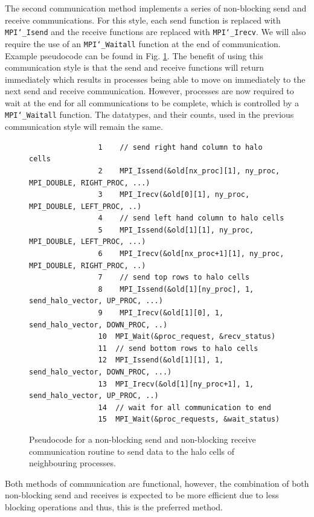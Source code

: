 \documentclass[11pt, a4paper]{article}
\begin{document}
			The second communication method implements a series of non-blocking send and receive communications. For this style, each send function is replaced with \texttt{MPI\char`_Isend} and the receive functions are replaced with \texttt{MPI\char`_Irecv}. We will also require the use of an \texttt{MPI\char`_Waitall} function at the end of communication. Example pseudocode can be found in Fig. \ref{fig:communication2}. The benefit of using this communication style is that the send and receive functions will return immediately which results in processes being able to move on immediately to the next send and receive communication. However, processes are now required to wait at the end for all communications to be complete, which is controlled by a \texttt{MPI\char`_Waitall} function. The datatypes, and their counts, used in the previous communication style will remain the same. 
			
			\begin{figure}
				\begin{verbatim}
				1	 // send right hand column to halo cells
				2	 MPI_Issend(&old[nx_proc][1], ny_proc, MPI_DOUBLE, RIGHT_PROC, ...)
				3	 MPI_Irecv(&old[0][1], ny_proc, MPI_DOUBLE, LEFT_PROC, ..)
				4	 // send left hand column to halo cells
				5	 MPI_Issend(&old[1][1], ny_proc, MPI_DOUBLE, LEFT_PROC, ...)
				6	 MPI_Irecv(&old[nx_proc+1][1], ny_proc, MPI_DOUBLE, RIGHT_PROC, ..)
				7	 // send top rows to halo cells
				8	 MPI_Issend(&old[1][ny_proc], 1, send_halo_vector, UP_PROC, ...)
				9	 MPI_Irecv(&old[1][0], 1, send_halo_vector, DOWN_PROC, ..)
				10	MPI_Wait(&proc_request, &recv_status)
				11	// send bottom rows to halo cells
				12	MPI_Issend(&old[1][1], 1, send_halo_vector, DOWN_PROC, ...)
				13	MPI_Irecv(&old[1][ny_proc+1], 1, send_halo_vector, UP_PROC, ..)
				14	// wait for all communication to end
				15	MPI_Wait(&proc_requests, &wait_status)		
				\end{verbatim}
				\caption{Pseudocode for a non-blocking send and non-blocking receive communication routine to send data to the halo cells of neighbouring processes.}
				\label{fig:communication2}
			\end{figure}
			
			Both methods of communication are functional, however, the combination of both non-blocking send and receives is expected to be more efficient due to less blocking operations and thus, this is the preferred method.
			
\end{document}
